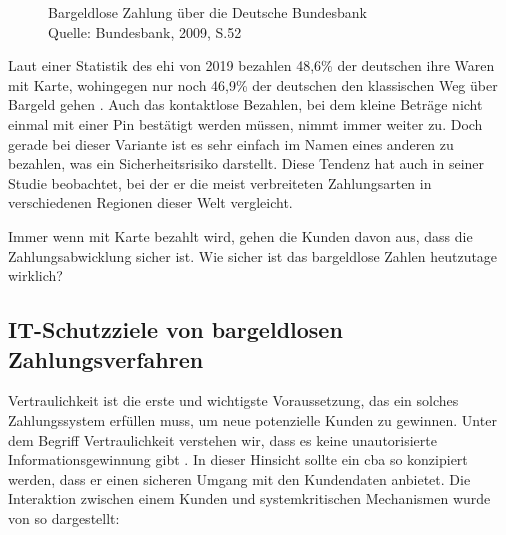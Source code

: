 \begin{figure}[H]
    \caption{Bargeldlose Zahlung über die Deutsche Bundesbank\\ Quelle: Bundesbank, 2009, S.52}
    \label{fig:refrep_DB}
\end{figure}


Laut einer Statistik des \acrfull{ehi} von 2019 bezahlen 48,6\% der deutschen ihre Waren mit Karte, 
wohingegen nur noch 46,9\% der deutschen den klassischen Weg über Bargeld gehen \cite{refart:KSDL} . 
Auch das kontaktlose Bezahlen, bei dem kleine Beträge nicht einmal mit einer \acrfull{Pin} bestätigt 
werden müssen, nimmt immer weiter zu. Doch gerade bei dieser Variante ist es sehr einfach im Namen 
eines anderen zu bezahlen, was ein Sicherheitsrisiko darstellt. Diese Tendenz hat \cite{refart:TDMP} auch 
in seiner Studie beobachtet, bei der er die meist verbreiteten Zahlungsarten in verschiedenen Regionen
 dieser Welt vergleicht. 


Immer wenn mit Karte bezahlt wird, gehen die Kunden davon aus, dass die Zahlungsabwicklung sicher ist. 
Wie sicher ist das bargeldlose Zahlen heutzutage wirklich? 


\subsection{IT-Schutzziele von bargeldlosen Zahlungsverfahren}


Vertraulichkeit ist die erste und wichtigste Voraussetzung, das ein solches Zahlungssystem erfüllen muss, 
um neue potenzielle Kunden zu gewinnen. Unter dem Begriff Vertraulichkeit verstehen wir, dass es keine 
unautorisierte Informationsgewinnung gibt \cite{refbook:SWIS}. In dieser Hinsicht sollte ein \acrshort{cba}
so konzipiert werden, dass er einen sicheren Umgang mit den Kundendaten anbietet. Die Interaktion zwischen
einem Kunden und systemkritischen Mechanismen wurde von \cite{refart:HARE} so dargestellt:

